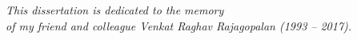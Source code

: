 \clearpage
\vspace*{\fill}
\begin{center}
\textit{This dissertation is dedicated to the memory \\ 
of my friend and colleague Venkat Raghav Rajagopalan (1993 -- 2017).}
\end{center}
\vspace*{\fill}

